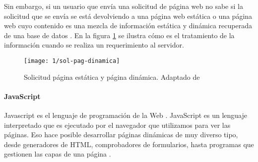 Sin embargo, si un usuario  que envía una solicitud de página web no sabe si la solicitud que se envía se está devolviendo a una página web estática o una página web cuyo contenido es una mezcla de información estática y dinámica recuperada de una base de datos \cite{Hoffer2016}.
En la figura \ref{fig:sol-pag-din} se ilustra cómo es el tratamiento de la información cuando se realiza un requerimiento al servidor.
 \begin{figure} %
	\texttt{[image: 1/sol-pag-dinamica]}
	\caption{Solicitud página estática y página dinámica. Adaptado de \HO}
	\label{fig:sol-pag-din}
\end{figure}



\paragraph{JavaScript} 

Javascript es el lenguaje de programación de la Web . \gls{JavaScript} es  un lenguaje interpretado que es ejecutado por el navegador que utilizamos para ver las páginas. Eso hace posible  desarrollar páginas dinámicas de muy diverso tipo, desde generadores de HTML, comprobadores de formularios, hasta programas que gestionen las capas de una página .  

